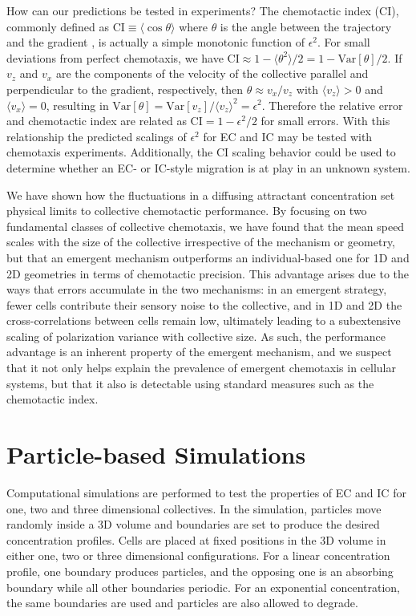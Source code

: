 How can our predictions be tested in experiments? The chemotactic index (CI), commonly defined as
$\text{CI} \equiv \langle \cos\theta \rangle$ where $\theta$ is the angle between the trajectory and the gradient \cite{van2007biased}, is actually a simple monotonic function of $\epsilon^2$. For small deviations from perfect chemotaxis, we have
$\text{CI} \approx 1 - \langle \theta^2 \rangle/2 = 1 - \text{Var}[\theta]/2$.
If $v_z$ and $v_x$ are the components of the velocity of the collective parallel and perpendicular to the gradient, respectively, then $\theta \approx v_x/v_z$ with $\langle v_z\rangle > 0$ and $\langle v_x\rangle = 0$, resulting in
$\text{Var}[\theta] = \text{Var}[v_z] / \langle v_z\rangle^2 = \epsilon^2$.
Therefore the relative error and chemotactic index are related as
$\text{CI} = 1 - \epsilon^2/2$ for small errors.
With this relationship the predicted scalings of $\epsilon^2$ for EC and IC may be tested with chemotaxis experiments. Additionally, the
CI scaling behavior could be used to determine whether an EC- or IC-style migration is at play in an unknown system.

We have shown how the fluctuations in a diffusing attractant concentration set physical limits to collective chemotactic performance. By focusing on two fundamental classes of collective chemotaxis, we have found that the mean speed scales with the size of the collective irrespective of the mechanism or geometry, but that an emergent mechanism outperforms an individual-based one for 1D and 2D geometries in terms of chemotactic precision.
This advantage arises due to the ways that errors accumulate in the two mechanisms: in an emergent strategy, fewer cells contribute their sensory noise to the collective, and in 1D and 2D the cross-correlations between cells remain low, ultimately leading to a subextensive scaling of polarization variance with collective size. As such, the performance advantage is an inherent property of the emergent mechanism, and we suspect that it not only helps explain the prevalence of emergent chemotaxis in cellular systems, but that it also is detectable using standard measures such as the chemotactic index.


\section{Particle-based Simulations} \label{sct:ch3_sim}

Computational simulations are performed to test the properties of EC and IC for one, two and three dimensional collectives. In the simulation, particles move randomly inside a 3D volume and boundaries are set to produce the desired concentration profiles. Cells are placed at fixed positions in the 3D volume in either one, two or three dimensional configurations. For a linear concentration profile, one boundary produces particles, and the opposing one is an absorbing boundary while all other boundaries periodic. For an exponential concentration, the same boundaries are used and particles are also allowed to degrade.

